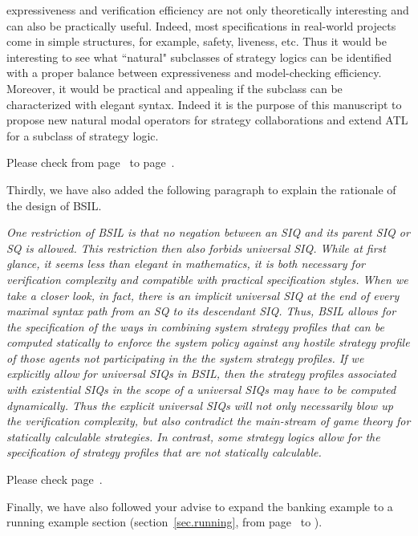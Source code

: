 \documentclass[11pt]{article}
\newcounter{cabbage1}
\newcounter{cabbage2}
\newcounter{cabbage3}
\newcounter{bean1}
\newcounter{bean2}
\newcounter{bean3}
\newcounter{bean4}
\newcounter{bean5}
\newcounter{bean6}
\newenvironment{reply2}{\begin{list}{\bf (Reply 2.\arabic{bean2}):} 
        {\usecounter{bean2}\setcounter{bean2}{\value{cabbage2}} 
        \item \setcounter{cabbage2}{\value{bean2}} 
        }
}{\end{list}}
\begin{document}
\begin{reply2}
\begin{center}
{expressiveness and verification efficiency are not only theoretically interesting and 
can also be practically useful.  
Indeed, most specifications in real-world projects come 
in simple structures, for example, safety, liveness, etc. 
Thus it would be interesting to see what ``natural" subclasses of strategy logics 
can be identified with a proper balance between expressiveness and model-checking efficiency.  
Moreover, it would be practical and appealing if the subclass 
can be characterized with elegant syntax.  
Indeed it is the purpose of this manuscript to propose new natural modal operators 
for strategy collaborations and extend ATL for a subclass of strategy logic.  
} 
\end{center} 
Please check from page~\pageref{reply2.motive1} 
to page~\pageref{reply2.motive2}.   

Thirdly, we have also added the following paragraph to 
explain the rationale of the design of BSIL. 
\begin{center} 
\parbox{120mm}{\em 
One restriction of BSIL is that no negation between an SIQ and its parent SIQ or SQ is allowed. 
This restriction then also forbids universal SIQ.  
While at first glance, it seems less than elegant in mathematics, 
it is both necessary for verification complexity and 
compatible with practical specification styles.  
When we take a closer look, in fact, there is an implicit universal SIQ 
at the end of every maximal syntax path from an SQ to its descendant SIQ.  
Thus, BSIL allows for the specification of the ways in combining system strategy profiles that 
can be computed statically to enforce the system policy against 
any hostile strategy profile of those agents not participating in the the system strategy 
profiles.  
If we explicitly allow for universal SIQs in BSIL, 
then the strategy profiles associated with existential SIQs in the scope of a universal SIQs 
may have to be computed dynamically.  
Thus the explicit universal SIQs will not only necessarily blow up the verification complexity, 
but also contradict the main-stream of game theory for statically calculable strategies.  
In contrast, some strategy logics \cite{MMV10} 
allow for the specification of strategy profiles that are not statically calculable.  
}
\end{center} 
Please check page~\pageref{reply2.motive3}.  

Finally, we have also followed your advise to expand the banking example to 
a running example section (section~\ref{sec.running}, 
from page~\pageref{sec.running} to \pageref{sec.gg}).  
\end{reply2} 
\end{document}
